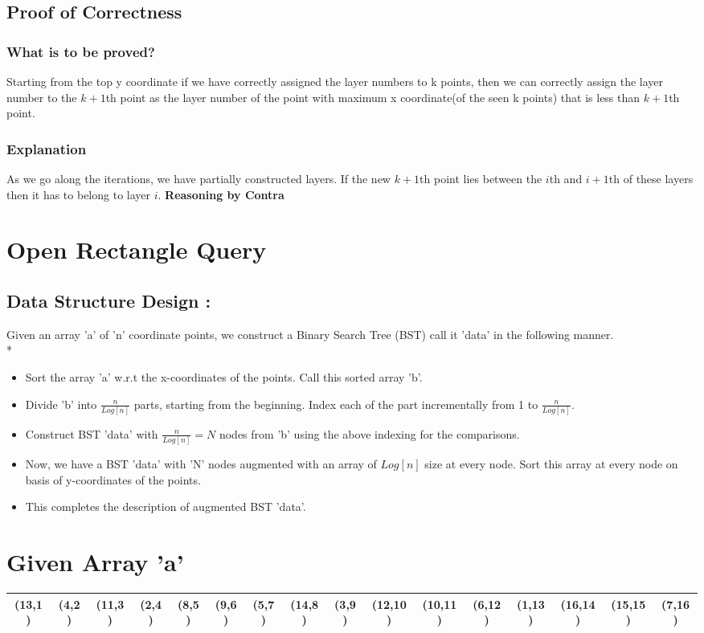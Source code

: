 \documentclass{article}
\begin{document}
\subsection{Proof of Correctness}
\subsubsection{What is to be proved?}
Starting from the top y coordinate if we have correctly assigned the layer numbers to k points, then we can correctly assign the layer number to the $k+1$th point as the layer number of the point with maximum x coordinate(of the seen k points) that is less than $k+1$th point.
\subsubsection{Explanation}
As we go along the iterations, we have partially constructed layers. If the new $k+1$th point lies between the $i$th and $i+1$th of these layers then it has to belong to layer $i$. 
{\bf Reasoning by Contra}

\newpage
\section{ Open Rectangle Query }
\subsection{Data Structure Design : } 
Given an array 'a' of 'n' coordinate points, we construct a Binary Search Tree (BST) call it 'data' in the following manner.\\*
\begin{itemize}
\item Sort the array 'a' w.r.t the x-coordinates of the points. Call this sorted array 'b'.
\item Divide 'b' into $ \frac{n}{Log[n]} $ parts, starting from the beginning. Index each of the part incrementally from 1 to $ \frac{n}{Log[n]} $. 
\item Construct BST 'data' with $ \frac{n}{Log[n]} = N $ nodes from 'b' using the above indexing for the comparisons.
\item Now, we have a BST 'data' with 'N' nodes augmented with an array of $Log[n]$ size at every node. Sort this array at every node on basis of y-coordinates of the points.
\item This completes the description of augmented BST 'data'.
\end{itemize}
\section*{Given Array 'a'}
\hspace{-4.8cm}
\begin{tabular}{ |c|c|c|c|c|c|c|c|c|c|c|c|c|c|c|c|}
\hline
\cellcolor{red} (13,1) & (4,2) & (11,3) & (2,4) & \cellcolor{red} (8,5) & (9,6) & (5,7) & (14,8) & \cellcolor{red} (3,9) & (12,10) & (10,11) & (6,12) & \cellcolor{red} (1,13) & (16,14) & (15,15) & (7,16) \\ \hline
\end{tabular}
\end{document}
